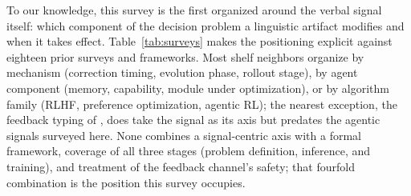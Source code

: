 To our knowledge, this survey is the first organized around the verbal signal itself: which component of the decision problem a linguistic artifact modifies and when it takes effect. Table~\ref{tab:surveys} makes the positioning explicit against eighteen prior surveys and frameworks. Most shelf neighbors organize by mechanism (correction timing, evolution phase, rollout stage), by agent component (memory, capability, module under optimization), or by algorithm family (RLHF, preference optimization, agentic RL); the nearest exception, the feedback typing of \citet{fernandes2023bridging}, does take the signal as its axis but predates the agentic signals surveyed here. None combines a signal-centric axis with a formal framework, coverage of all three stages (problem definition, inference, and training), and treatment of the feedback channel's safety; that fourfold combination is the position this survey occupies.

